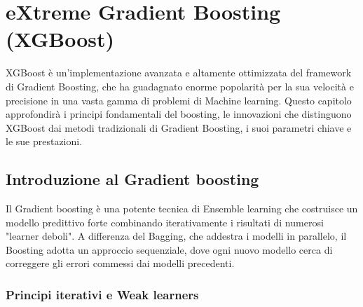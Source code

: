 \documentclass[a4paper,12pt]{report}
\begin{document}
	\chapter{eXtreme Gradient Boosting (XGBoost)}
	
	XGBoost è un'implementazione avanzata e altamente ottimizzata del framework di Gradient Boosting, che ha guadagnato enorme popolarità per la sua velocità e precisione in una vasta gamma di problemi di Machine learning. Questo capitolo approfondirà i principi fondamentali del boosting, le innovazioni che distinguono XGBoost dai metodi tradizionali di Gradient Boosting, i suoi parametri chiave e le sue prestazioni.
	
	\section{Introduzione al Gradient boosting}
	
	Il Gradient boosting è una potente tecnica di Ensemble learning che costruisce un modello predittivo forte combinando iterativamente i risultati di numerosi "learner deboli". A differenza del Bagging, che addestra i modelli in parallelo, il Boosting adotta un approccio sequenziale, dove ogni nuovo modello cerca di correggere gli errori commessi dai modelli precedenti.
	
	\subsection{Principi iterativi e Weak learners}
	
\end{document}
